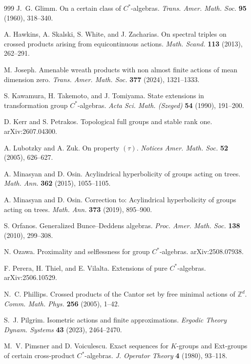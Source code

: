 \documentclass[11pt,a4,leqno]{amsart}
\theoremstyle{definition}
\theoremstyle{remark}
\numberwithin{equation}{section}
\theoremstyle{plain}
\newcommand{\Zb}{\mathbb{Z}}
\begin{document}
\begin{thebibliography}{999}
J.~G. Glimm.
On a certain class of $C^*$-algebras.
{\it Trans. Amer. Math. Soc.} {\bf 95} (1960), 318--340. 

A. Hawkins, A. Skalski, S. White, and J. Zacharias.
On spectral triples on crossed products arising from equicontinuous actions.
{\it Math. Scand.} {\bf 113} (2013), 262--291. 

M. Joseph.
Amenable wreath products with non almost finite actions of mean dimension zero.
{\it Trans. Amer. Math. Soc.} {\bf 377} (2024), 1321--1333.

S. Kawamura, H. Takemoto, and J. Tomiyama. 
State extensions in transformation group $C^*$-algebras.
{\it Acta Sci. Math. (Szeged)} {\bf 54} (1990), 191--200. 

D. Kerr and S. Petrakos.
Topological full groups and stable rank one.
arXiv:2607.04300.

A. Lubotzky and A. Zuk.
On property $(\tau)$.
{\it Notices Amer. Math. Soc.} {\bf 52} (2005), 626--627.

A. Minasyan and D. Osin.
Acylindrical hyperbolicity of groups acting on trees.
{\it Math. Ann.} {\bf 362} (2015), 1055--1105.

A. Minasyan and D. Osin.
Correction to: Acylindrical hyperbolicity of groups acting on trees.
{\it Math. Ann.} {\bf 373} (2019), 895--900.

S. Orfanos.
Generalized Bunce--Deddens algebras.
{\it Proc. Amer. Math. Soc.} {\bf 138} (2010), 299--308. 

N. Ozawa.
Proximality and selflessness for group $C^*$-algebras.
arXiv:2508.07938.

F. Perera, H. Thiel, and E. Vilalta.
Extensions of pure $C^*$-algebras.
arXiv:2506.10529. 

N.~C. Phillips.
Crossed products of the Cantor set by free minimal actions of $\Zb^d$.
{\it Comm. Math. Phys.} {\bf 256} (2005), 1--42.

S.~J. Pilgrim.
Isometric actions and finite approximations.
{\it Ergodic Theory Dynam. Systems} {\bf 43} (2023), 2464--2470. 

M.~V. Pimsner and D. Voiculescu.
Exact sequences for $K$-groups and Ext-groups of certain cross-product $C^*$-algebras.
{\it J. Operator Theory} {\bf 4} (1980), 93--118.


\end{thebibliography}
\end{document}
